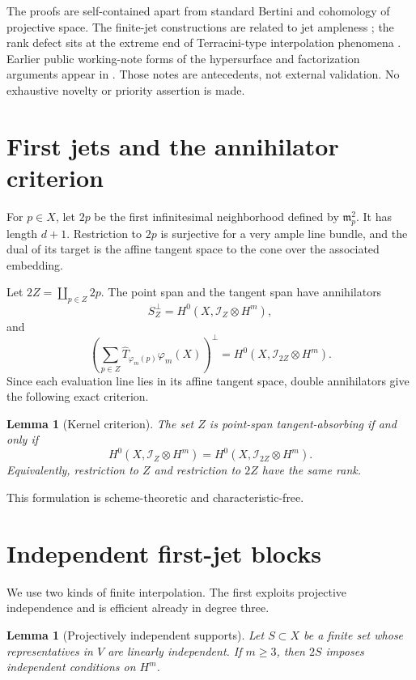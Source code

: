 \documentclass[11pt]{article}
\newtheorem{lemma}[theorem]{Lemma}
\begin{document}
The proofs are self-contained apart from standard Bertini and cohomology of
projective space.  The finite-jet constructions are related to jet ampleness
\cite{BeltramettiDiRoccoSommese1999}; the rank defect sits at the extreme end
of Terracini-type interpolation phenomena
\cite{BallicoChiantini2021,GaluppiEtAl2023}.  Earlier public working-note
forms of the hypersurface and factorization arguments appear in
\cite{ErikssonB219,ErikssonB220}.  Those notes are antecedents, not external
validation.  No exhaustive novelty or priority assertion is made.

\section{First jets and the annihilator criterion}

For $p\in X$, let $2p$ be the first infinitesimal neighborhood defined by
$\mathfrak m_p^2$.  It has length $d+1$.  Restriction to $2p$ is surjective
for a very ample line bundle, and the dual of its target is the affine tangent
space to the cone over the associated embedding.

Let $2Z=\coprod_{p\in Z}2p$.  The point span and the tangent span have
annihilators
\[
 S_Z^\perp=H^0(X,\mathcal I_Z\otimes H^m),
\]
and
\[
 \left(\sum_{p\in Z}
 \widehat T_{\varphi_m(p)}\varphi_m(X)\right)^\perp
 =H^0(X,\mathcal I_{2Z}\otimes H^m).
\]
Since each evaluation line lies in its affine tangent space, double
annihilators give the following exact criterion.

\begin{lemma}[Kernel criterion]\label{lem:kernel}
The set $Z$ is point-span tangent-absorbing if and only if
\[
 H^0(X,\mathcal I_Z\otimes H^m)
 =H^0(X,\mathcal I_{2Z}\otimes H^m).
\]
Equivalently, restriction to $Z$ and restriction to $2Z$ have the same rank.
\end{lemma}

This formulation is scheme-theoretic and characteristic-free.

\section{Independent first-jet blocks}

We use two kinds of finite interpolation.  The first exploits projective
independence and is efficient already in degree three.

\begin{lemma}[Projectively independent supports]\label{lem:projective-blocks}
Let $S\subset X$ be a finite set whose representatives in $V$ are linearly
independent.  If $m\geq3$, then $2S$ imposes independent conditions on $H^m$.
\end{lemma}
\end{document}
